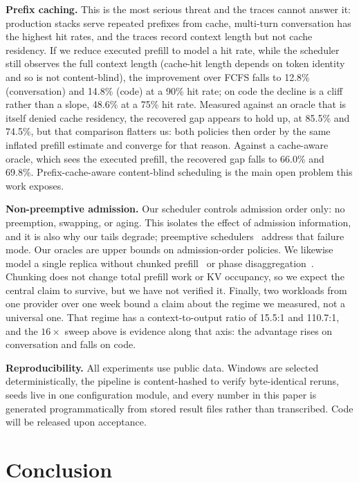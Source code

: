 \documentclass[conference,10pt,letterpaper]{IEEEtran}
\begin{document}
\textbf{Prefix caching.} This is the most serious threat and the traces cannot
answer it: production stacks serve repeated prefixes from cache, multi-turn
conversation has the highest hit rates, and the traces record context length but
not cache residency. If we reduce executed prefill to model a hit rate, while the
scheduler still observes the full context length (cache-hit length depends on
token identity and so is not content-blind), the improvement over FCFS falls to
12.8\% (conversation) and 14.8\% (code) at a 90\% hit rate; on code the decline
is a cliff rather than a slope, 48.6\% at a 75\% hit rate. Measured against an
oracle that is itself denied cache residency, the recovered gap appears to hold
up, at 85.5\% and 74.5\%, but that comparison flatters us: both policies then
order by the same inflated prefill estimate and converge for that reason.
Against a cache-aware oracle, which sees the executed prefill, the recovered gap
falls to 66.0\% and 69.8\%. Prefix-cache-aware content-blind scheduling is the
main open problem this work exposes.

\textbf{Non-preemptive admission.} Our scheduler controls admission order only:
no preemption, swapping, or aging. This isolates the effect of admission
information, and it is also why our tails degrade; preemptive
schedulers~\cite{wu2026fastserve,pecsched} address that failure mode. Our
oracles are upper bounds on admission-order policies. We likewise
model a single replica without chunked prefill~\cite{agrawal2024sarathi} or
phase disaggregation~\cite{patel2024splitwise,zhong2024distserve}. Chunking does
not change total prefill work or KV occupancy, so we
expect the central claim to survive, but we have not verified it. Finally, two
workloads from one provider over one week bound a claim about the regime we
measured, not a universal one. That regime has a context-to-output ratio of
15.5:1 and 110.7:1, and the $16\times$ sweep above is evidence along that
axis: the advantage rises on conversation and falls on code.

\textbf{Reproducibility.} All experiments use public data. Windows are selected
deterministically, the pipeline is content-hashed to verify byte-identical
reruns, seeds live in one configuration module, and every number in this paper
is generated programmatically from stored result files rather than transcribed.
Code will be released upon acceptance.

\section{Conclusion}
\label{sec:conclusion}
\end{document}
